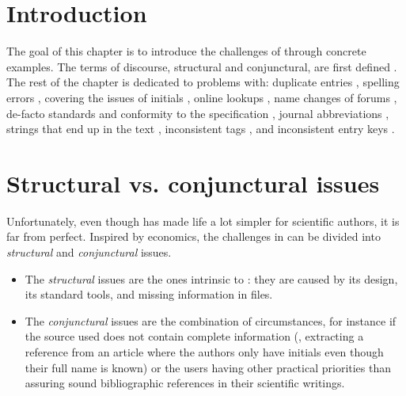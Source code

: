 
\section{Introduction}
The goal of this chapter is to introduce the challenges of {\bibtex}
through concrete examples.  The terms of discourse, structural and
conjunctural, are first defined
.  The rest of the
chapter is dedicated to problems with: duplicate entries
, spelling errors
, covering the issues of initials
, online lookups
, name changes of forums
, de-facto standards and conformity
to the {\bibtex} specification ,
journal abbreviations , {\bibtex}
strings that end up in the text
, inconsistent tags
, and inconsistent entry keys
 .

\section{Structural vs. conjunctural issues}
\label{sec:problems_structural_conjunctural}

Unfortunately, even though {\bibtex} has made life a lot simpler for
scientific authors, it is far from perfect.  Inspired by economics,
the challenges in {\bibtex} can be divided into \emph{structural} and
\emph{conjunctural} issues.

\begin{itemize}
\item The \emph{structural} issues are the ones intrinsic to
  {\bibtex}: they are caused by its design, its standard tools, and
  missing information in {\bibtex} files.

\item The \emph{conjunctural} issues are the combination of
  circumstances, for instance if the source used does not contain
  complete information (\eg, extracting a reference from an article
  where the authors only have initials even though their full name is
  known) or the users having other practical priorities than assuring
  sound bibliographic references in their scientific writings.
\end{itemize}

